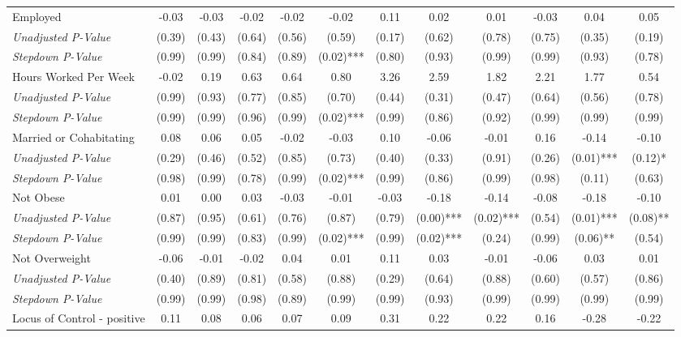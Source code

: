 \begin{tabular}{l c c c c c c c c c c c}
Employed & -0.03 & -0.03 & -0.02 & -0.02 & -0.02 & 0.11 & 0.02 & 0.01 & -0.03 & 0.04 & 0.05 \\
\quad \textit{Unadjusted P-Value} & (0.39) & (0.43) & (0.64) & (0.56) & (0.59) & (0.17) & (0.62) & (0.78) & (0.75) & (0.35) & (0.19) \\
\quad \textit{Stepdown P-Value} & (0.99) & (0.99) & (0.84) & (0.89) & (0.02)*** & (0.80) & (0.93) & (0.99) & (0.99) & (0.93) & (0.78) \\
Hours Worked Per Week & -0.02 & 0.19 & 0.63 & 0.64 & 0.80 & 3.26 & 2.59 & 1.82 & 2.21 & 1.77 & 0.54 \\
\quad \textit{Unadjusted P-Value} & (0.99) & (0.93) & (0.77) & (0.85) & (0.70) & (0.44) & (0.31) & (0.47) & (0.64) & (0.56) & (0.78) \\
\quad \textit{Stepdown P-Value} & (0.99) & (0.99) & (0.96) & (0.99) & (0.02)*** & (0.99) & (0.86) & (0.92) & (0.99) & (0.99) & (0.99) \\
Married or Cohabitating & 0.08 & 0.06 & 0.05 & -0.02 & -0.03 & 0.10 & -0.06 & -0.01 & 0.16 & -0.14 & -0.10 \\
\quad \textit{Unadjusted P-Value} & (0.29) & (0.46) & (0.52) & (0.85) & (0.73) & (0.40) & (0.33) & (0.91) & (0.26) & (0.01)*** & (0.12)* \\
\quad \textit{Stepdown P-Value} & (0.98) & (0.99) & (0.78) & (0.99) & (0.02)*** & (0.99) & (0.86) & (0.99) & (0.98) & (0.11) & (0.63) \\
Not Obese & 0.01 & 0.00 & 0.03 & -0.03 & -0.01 & -0.03 & -0.18 & -0.14 & -0.08 & -0.18 & -0.10 \\
\quad \textit{Unadjusted P-Value} & (0.87) & (0.95) & (0.61) & (0.76) & (0.87) & (0.79) & (0.00)*** & (0.02)*** & (0.54) & (0.01)*** & (0.08)** \\
\quad \textit{Stepdown P-Value} & (0.99) & (0.99) & (0.83) & (0.99) & (0.02)*** & (0.99) & (0.02)*** & (0.24) & (0.99) & (0.06)** & (0.54) \\
Not Overweight & -0.06 & -0.01 & -0.02 & 0.04 & 0.01 & 0.11 & 0.03 & -0.01 & -0.06 & 0.03 & 0.01 \\
\quad \textit{Unadjusted P-Value} & (0.40) & (0.89) & (0.81) & (0.58) & (0.88) & (0.29) & (0.64) & (0.88) & (0.60) & (0.57) & (0.86) \\
\quad \textit{Stepdown P-Value} & (0.99) & (0.99) & (0.98) & (0.89) & (0.99) & (0.99) & (0.93) & (0.99) & (0.99) & (0.99) & (0.99) \\
Locus of Control - positive & 0.11 & 0.08 & 0.06 & 0.07 & 0.09 & 0.31 & 0.22 & 0.22 & 0.16 & -0.28 & -0.22 \\

\end{tabular}
